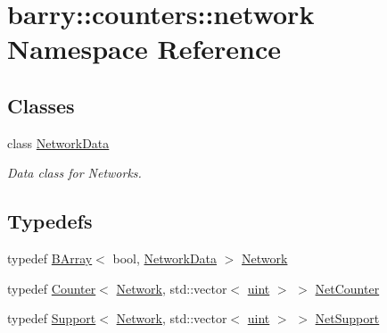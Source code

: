\hypertarget{namespacebarry_1_1counters_1_1network}{}\section{barry\+:\+:counters\+:\+:network Namespace Reference}
\label{namespacebarry_1_1counters_1_1network}
\subsection*{Classes}
\begin{DoxyCompactItemize}
\item 
class \hyperlink{classbarry_1_1counters_1_1network_1_1_network_data}{Network\+Data}
\begin{DoxyCompactList}\small\item\em Data class for Networks. \end{DoxyCompactList}\end{DoxyCompactItemize}
\subsection*{Typedefs}
\begin{DoxyCompactItemize}
\item 
typedef \hyperlink{classbarry_1_1_b_array}{B\+Array}$<$ bool, \hyperlink{classbarry_1_1counters_1_1network_1_1_network_data}{Network\+Data} $>$ \hyperlink{namespacebarry_1_1counters_1_1network_a4cb88d4572ded3b447ea269c9cd0b2c0}{Network}
\item 
typedef \hyperlink{classbarry_1_1_counter}{Counter}$<$ \hyperlink{namespacebarry_1_1counters_1_1network_a4cb88d4572ded3b447ea269c9cd0b2c0}{Network}, std\+::vector$<$ \hyperlink{namespacebarry_a11dfc53ddb4672278319aa04f1e09a6c}{uint} $>$ $>$ \hyperlink{namespacebarry_1_1counters_1_1network_a2d14cbc0a77bfba218df85a750bfeb84}{Net\+Counter}
\item 
typedef \hyperlink{classbarry_1_1_support}{Support}$<$ \hyperlink{namespacebarry_1_1counters_1_1network_a4cb88d4572ded3b447ea269c9cd0b2c0}{Network}, std\+::vector$<$ \hyperlink{namespacebarry_a11dfc53ddb4672278319aa04f1e09a6c}{uint} $>$ $>$ \hyperlink{namespacebarry_1_1counters_1_1network_a55b00fe30207cc3c3e5eecb6feb0db90}{Net\+Support}
\end{DoxyCompactItemize}
